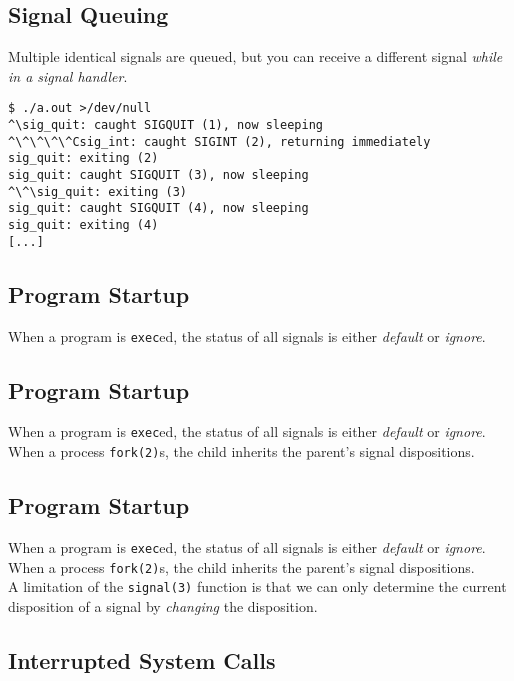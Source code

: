 \documentclass[xga]{xdvislides}
\begin{document}
\subsection{Signal Queuing}
Multiple identical signals are queued, but you can receive a different
signal {\em while in a signal handler}.
\begin{verbatim}
$ ./a.out >/dev/null
^\sig_quit: caught SIGQUIT (1), now sleeping
^\^\^\^\^Csig_int: caught SIGINT (2), returning immediately
sig_quit: exiting (2)
sig_quit: caught SIGQUIT (3), now sleeping
^\^\sig_quit: exiting (3)
sig_quit: caught SIGQUIT (4), now sleeping
sig_quit: exiting (4)
[...]
\end{verbatim}

\subsection{Program Startup}

When a program is {\tt exec}ed, the status of all signals is either {\em
default} or {\em ignore}.

\subsection{Program Startup}

When a program is {\tt exec}ed, the status of all signals is either {\em
default} or {\em ignore}.
\\

When a process {\tt fork(2)}s, the child inherits the parent's signal
dispositions.

\subsection{Program Startup}

When a program is {\tt exec}ed, the status of all signals is either {\em
default} or {\em ignore}.
\\

When a process {\tt fork(2)}s, the child inherits the parent's signal
dispositions.
\\

A limitation of the {\tt signal(3)} function is that we can only determine the
current disposition of a signal by {\em changing} the disposition.

\subsection{Interrupted System Calls}
\end{document}
